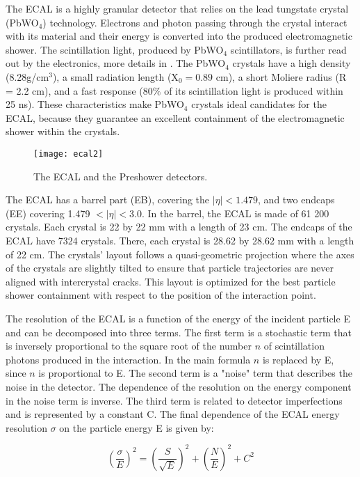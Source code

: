\begin{normalsize}
The ECAL is a highly granular detector that relies on the lead tungstate crystal (PbWO$_4$) technology. Electrons and photon passing through the crystal interact with its material and their energy is converted into the produced electromagnetic shower. The scintillation light, produced by PbWO$_4$ scintillators, is further read out by the electronics, more details in \cite{CMS_TDR}. The PbWO$_4$ crystals have a high density (8.28g/cm$^3$), a small radiation length (X$_0 = 0.89$ cm), a short Moliere radius (R = 2.2 cm), and a fast response (80$\%$ of its scintillation light is produced within 25 ns). These characteristics make PbWO$_4$ crystals ideal candidates for the ECAL, because they guarantee an excellent containment of the electromagnetic shower within the crystals. 



\begin{figure}[H]
  \centering
  \texttt{[image: ecal2]}
  \caption[The ECAL]{The ECAL and the Preshower detectors.}
  \label{ecal2}
\end{figure}

The ECAL has a barrel part (EB), covering the $|\eta|< 1.479$, and two endcaps (EE) covering 1.479 $< |\eta |  < 3.0$. In the barrel, the ECAL is made of 61 200 crystals. Each crystal is 22 by 22 mm with a length of 23 cm. The endcaps of the ECAL have 7324 crystals. There, each crystal is 28.62 by 28.62 mm with a length of 22 cm. The crystals' layout follows a quasi-geometric projection where the axes of the crystals are slightly tilted to ensure that particle trajectories are never aligned with intercrystal cracks. This layout is optimized for the best particle shower containment with respect to the position of the interaction point.  

The resolution of the ECAL is a function of the energy of the incident particle E and can be decomposed into three terms. The first term is a stochastic term that is inversely proportional to the square root of the number $n$ of scintillation photons produced in the interaction. In the main formula $n$ is replaced by E, since $n$ is proportional to E. The second term is a "noise" term that describes the noise in the detector. The dependence of the resolution on the energy component in the noise term is inverse. The third term is related to detector imperfections and is represented by a constant C. The final dependence of the ECAL energy resolution $\sigma$ on the particle energy E is given by:

  
\begin{equation}
  \left(\frac{\sigma}{E}\right)^2 = \left(\frac{S}{\sqrt{E}}\right)^2 +
  \left(\frac{N}{E}\right)^2 + C^2
  \label{eq:ecal}
\end{equation}


\end{normalsize}
